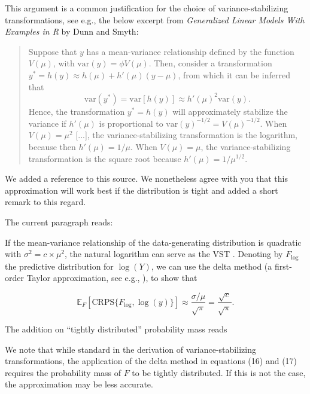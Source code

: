 \documentclass{article}
\newcommand{\black}{\color{black}}
\newcommand{\indented}{\setlength{\leftskip}{1cm}}
\newcommand{\notindented}{\setlength{\leftskip}{0cm}}
\begin{document}
\black

This argument is a common justification for the choice of variance-stabilizing transformations, see e.g., the below excerpt from \textit{Generalized Linear Models With Examples in R} by Dunn and Smyth:
\begin{quote}
Suppose that $y$ has a mean-variance relationship defined by the function $V(\mu)$, with $\text{var}(y) = \phi V(\mu)$. Then, consider a transformation $y^* = h(y) \approx h(\mu) + h'(\mu)(y - \mu)$, from which it can be inferred that
$$
\text{var}(y^*) = \text{var}[h(y)] \approx h'(\mu)^2\text{var}(y).
$$
Hence, the transformation $y^* = h(y)$ will approximately stabilize the variance if $h'(\mu)$ is proportional to $\text{var}(y)^{-1/2} = V(\mu)^{-1/2}$. When $V(\mu) = \mu^2$ [...], the variance-stabilizing transformation is the logarithm, because then $h'(\mu) = 1/\mu$.  When $V(\mu) = \mu$, the variance-stabilizing transformation is the square root because $h'(\mu) = 1/\mu^{1/2}$.
\end{quote}

We added a reference to this source. We nonetheless agree with you that this approximation will work best if the distribution is tight and added a short remark to this regard.

The current paragraph reads: 

\indented

If the mean-variance relationship of the data-generating distribution is quadratic with $\sigma^2 = c \times \mu^2$, the natural logarithm can serve as the VST \citep{guerreroTimeseriesAnalysisSupported1993}. Denoting by $F_{\log}$ the predictive distribution for $\log(Y)$, we can use the delta method (a first-order Taylor approximation, see e.g., \citealt{Dunn2018}), to show that

\begin{equation}
\mathbb{E}_F[\text{CRPS}\{F_{\log}, \log(y)\}] \approx \frac{\sigma/\mu}{\sqrt{\pi}} 
= \frac{\sqrt{c}}{\sqrt{\pi}}
.
\end{equation}

\notindented

The addition on ``tightly distributed'' probability mass reads

\indented
We note that while standard in the derivation of variance-stabilizing transformations, the application of the delta method in equations (16) and (17) requires the probability mass of $F$ to be tightly distributed. If this is not the case, the approximation may be less accurate.
\end{document}

